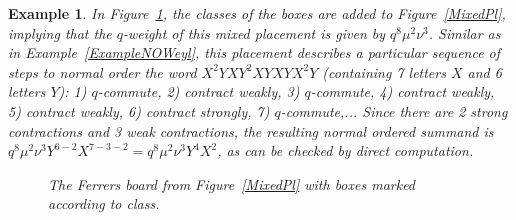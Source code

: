 \documentclass[10pt]{amsart}
\newtheorem{example}[theorem]{Example}%
\begin{document}
\begin{example}\label{ExampleNOOre}
In Figure~\ref{MixedPlClass}, the classes of the boxes are added to Figure~\ref{MixedPl}, implying that the $q$-weight of this mixed placement is given by $q^{8}\mu^2\nu^3$. Similar as in Example~\ref{ExampleNOWeyl}, this placement describes a particular sequence of steps to normal order the word $X^2YXY^2XYXYX^2Y$ (containing 7 letters $X$ and 6 letters $Y$): 1) $q$-commute, 2) contract weakly, 3) $q$-commute, 4) contract weakly, 5) contract weakly, 6) contract strongly, 7) $q$-commute,... Since there are 2 strong contractions and 3 weak contractions, the resulting normal ordered summand is $q^{8}\mu^2\nu^3 Y^{6-2}X^{7-3-2}=q^{8}\mu^2\nu^3 Y^{4}X^{2}$, as can be checked by direct computation. 

\begin{figure}[h]
\centering
{}
\caption{The Ferrers board from Figure~\ref{MixedPl} with boxes marked according to class.}\label{MixedPlClass}
\end{figure}
\end{example}
\end{document}
